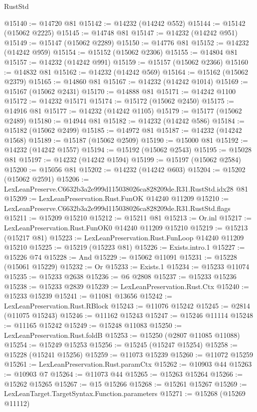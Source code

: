 \begin{lexlean}{RustStd}
\begin{coremodule}
@15140 := @14720 @81
@15142 := @14232 (@14242 @552)
@15144 := @15142 (@15062 @2225)
@15145 := @14748 @81
@15147 := @14232 (@14242 @951)
@15149 := @15147 (@15062 @2289)
@15150 := @14776 @81
@15152 := @14232 (@14242 @959)
@15154 := @15152 (@15062 @2306)
@15155 := @14804 @81
@15157 := @14232 (@14242 @991)
@15159 := @15157 (@15062 @2366)
@15160 := @14832 @81
@15162 := @14232 (@14242 @569)
@15164 := @15162 (@15062 @2379)
@15165 := @14860 @81
@15167 := @14232 (@14242 @1014)
@15169 := @15167 (@15062 @2431)
@15170 := @14888 @81
@15171 := @14242 @1100
@15172 := @14232 @15171
@15174 := @15172 (@15062 @2450)
@15175 := @14916 @81
@15177 := @14232 (@14242 @1105)
@15179 := @15177 (@15062 @2489)
@15180 := @14944 @81
@15182 := @14232 (@14242 @586)
@15184 := @15182 (@15062 @2499)
@15185 := @14972 @81
@15187 := @14232 (@14242 @1568)
@15189 := @15187 (@15062 @2509)
@15190 := @15000 @81
@15192 := @14232 (@14242 @1557)
@15194 := @15192 (@15062 @2543)
@15195 := @15028 @81
@15197 := @14232 (@14242 @1594)
@15199 := @15197 (@15062 @2584)
@15200 := @15056 @81
@15202 := @14232 (@14242 @603)
@15204 := @15202 (@15062 @2591)
@15206 := LexLeanPreserve.C6632b3a2e999d115038026ca828209de.R31.RustStd.idx28 @81
@15209 := LexLeanPreservation.Rust.FunOK @14240 @11209
@15210 := LexLeanPreserve.C6632b3a2e999d115038026ca828209de.R31.RustStd.flags
@15211 := @15209 @15210
@15212 := @15211 @81
@15213 := Or.inl
@15217 := LexLeanPreservation.Rust.FunOK0 @14240 @11209 @15210
@15219 := @15213 (@15217 @81)
@15223 := LexLeanPreservation.Rust.FunLoop @14240 @11209 @15210
@15225 := @15219 (@15223 @81)
@15226 := Exists.intro.{1}
@15227 := @15226 @74
@15228 := And
@15229 := @15062 @11091
@15231 := @15228 (@15061 @15229)
@15232 := Or
@15233 := Exists.{1}
@15234 := @15233 @11074
@15235 := @15233 @2638
@15236 := @6 @2808
@15237 := @15233 @15236
@15238 := @15233 @2839
@15239 := LexLeanPreservation.Rust.Ctx
@15240 := @15233 @15239
@15241 := @11081 @13656
@15242 := LexLeanPreservation.Rust.RBlock
@15243 := @11076 @15242
@15245 := @2814 (@11075 @15243)
@15246 := @11162 @15243
@15247 := @15246 @11114
@15248 := @11165 @15242
@15249 := @15248 @11083
@15250 := LexLeanPreservation.Rust.foldB
@15253 := @15250 (@2807 @11085 @11088)
@15254 := @15249 @15253
@15256 := @15245 (@15247 @15254)
@15258 := @15228 (@15241 @15256)
@15259 := @11073 @15239
@15260 := @11072 @15259
@15261 := LexLeanPreservation.Rust.paramCtx
@15262 := @10903 @44
@15263 := @10903 @7
@15264 := @11073 @44
@15265 := @15263 @15264
@15266 := @15262 @15265
@15267 := @15 @15266
@15268 := @15261 @15267
@15269 := LexLeanTarget.TargetSyntax.Function.parameters
@15271 := @15268 (@15269 @11112)

\end{coremodule}
\end{lexlean}
